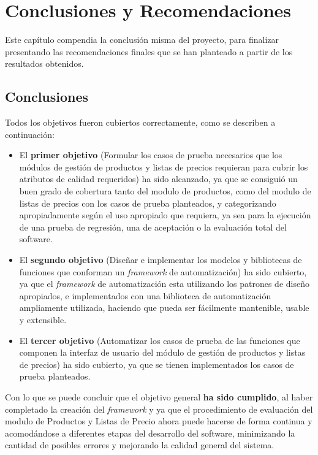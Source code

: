 \chapter{Conclusiones y Recomendaciones}

Este capítulo compendia la conclusión misma del proyecto, para finalizar
presentando las recomendaciones finales que se han planteado a partir de los
resultados obtenidos.

\section{Conclusiones}
Todos los objetivos fueron cubiertos correctamente, como se describen a
continuación:

\begin{itemize}
\item El \textbf{primer objetivo} (Formular los casos de prueba necesarios que
los módulos de gestión de productos y listas de precios requieran para cubrir
los atributos de calidad requeridos) ha sido alcanzado, ya que se consiguió un
buen grado de cobertura tanto del modulo de productos, como del modulo de listas
de precios con los casos de prueba planteados, y categorizando apropiadamente
según el uso apropiado que requiera, ya sea para la ejecución de una prueba de
regresión, una de aceptación o la evaluación total del software.
\item El \textbf{segundo objetivo} (Diseñar e implementar los modelos y
bibliotecas de funciones que conforman un \emph{framework} de automatización)
ha sido cubierto, ya que el \emph{framework} de automatización esta utilizando
los patrones de diseño apropiados, e implementados con una biblioteca de
automatización ampliamente utilizada, haciendo que pueda ser fácilmente
mantenible, usable y extensible.
\item El \textbf{tercer objetivo} (Automatizar los casos de prueba de las
funciones que componen la interfaz de usuario del módulo de gestión de productos
y listas de precios) ha sido cubierto, ya que se tienen implementados los casos
de prueba planteados.
\end{itemize}

Con lo que se puede concluir que el objetivo general \textbf{ha sido cumplido},
al haber completado la creación del \emph{framework} y ya que el procedimiento
de evaluación del modulo de Productos y Listas de Precio ahora puede hacerse de
forma continua y acomodándose a diferentes etapas del desarrollo del software,
minimizando la cantidad de posibles errores y mejorando la calidad general del
sistema.

